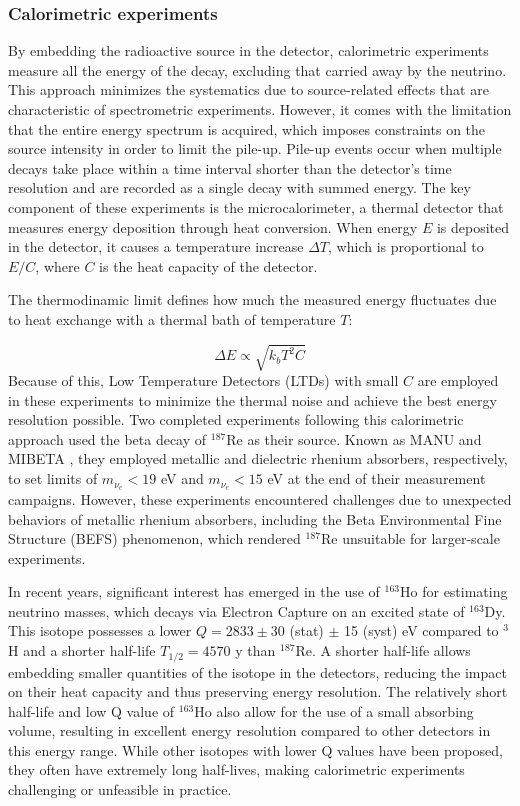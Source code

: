 \subsubsection*{Calorimetric experiments}
By embedding the radioactive source in the detector, calorimetric experiments measure all the energy of the decay,
excluding that carried away by the neutrino. This approach
minimizes the systematics due to source-related effects that are characteristic of spectrometric experiments. However, it comes
with the limitation that the entire energy spectrum is acquired, which imposes constraints on the source intensity in
order to limit the pile-up.
Pile-up events occur when multiple decays take place within a time interval shorter than the detector's time resolution
and are recorded as a single decay with summed energy.
The key component of these experiments is the microcalorimeter, a thermal detector that measures energy deposition
through heat conversion. When energy $E$ is deposited in the detector, it causes a temperature increase $\Delta T$,
which is proportional to $E/C$, where $C$ is the heat capacity of the detector. 

The thermodinamic limit defines how much
the measured energy fluctuates due to heat exchange with a thermal bath of temperature $T$:

\begin{equation}
  \Delta E \propto \sqrt{k_b T^2 C}
\end{equation}
Because of this, Low Temperature Detectors (LTDs) with small $C$ are employed in these experiments to minimize the thermal noise and achieve the best energy resolution possible.
Two completed experiments following this calorimetric approach used the beta decay of $^{187}$Re as their source. Known
as MANU and MIBETA  \cite{MANU} \cite{MIBETA}, they employed metallic and dielectric rhenium absorbers, respectively, to set limits of
$m_{\nu_{e}} < 19$ eV and $m_{\nu_{e}} < 15$ eV at the end of their measurement campaigns. However, these experiments
encountered challenges due to unexpected behaviors of metallic rhenium absorbers, including the Beta Environmental Fine
Structure (BEFS) \cite{koonin1991environmental} phenomenon, which rendered $^{187}$Re unsuitable for larger-scale experiments.

In recent years, significant interest has emerged in the use of $^{163}$Ho for estimating neutrino masses, which decays
via Electron Capture on an excited state of $^{163}$Dy. This isotope
possesses a lower $Q = 2833 \pm 30$ (stat) $\pm$ 15 (syst) eV compared to $^3$H and a shorter half-life
$T_{1/2} = 4570$ y than $^{187}$Re. 
A shorter half-life allows embedding smaller quantities of the isotope in the detectors, reducing the impact on their heat
capacity and thus preserving energy resolution.
The relatively short half-life and low Q value of $^{163}$Ho also allow for the use of a small absorbing volume, resulting in excellent energy resolution compared to other detectors in this energy range.
While other isotopes with lower Q values have been proposed, they often have extremely long half-lives, making
calorimetric experiments challenging or unfeasible in practice.

